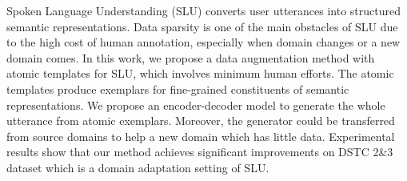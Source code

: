 Spoken Language Understanding (SLU) converts user utterances into structured semantic representations. Data sparsity is one of the main obstacles of SLU due to the high cost of human annotation, especially when domain changes or a new domain comes. In this work, we propose a data augmentation method with atomic templates for SLU, which involves minimum human efforts. The atomic templates produce exemplars for fine-grained constituents of semantic representations. We propose an encoder-decoder model to generate the whole utterance from atomic exemplars. Moreover, the generator could be transferred from source domains to help a new domain which has little data. Experimental results show that our method achieves significant improvements on DSTC 2\&3 dataset which is a domain adaptation setting of SLU.